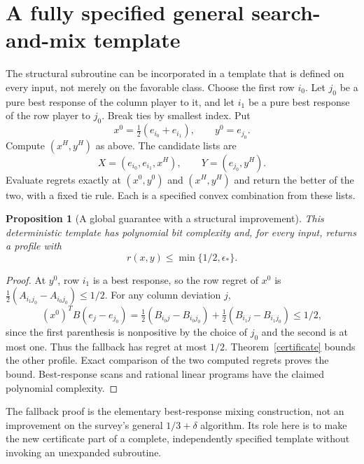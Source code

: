 \documentclass[11pt]{article}
\newtheorem{proposition}[theorem]{Proposition}
\theoremstyle{definition}
\begin{document}
\section{A fully specified general search-and-mix template}
The structural subroutine can be incorporated in a template that is
defined on every input, not merely on the favorable class. Choose the
first row $i_0$. Let $j_0$ be a pure best response of the column player
to it, and let $i_1$ be a pure best response of the row player to $j_0$.
Break ties by smallest index. Put
\[
 x^0=\tfrac12(e_{i_0}+e_{i_1}),\qquad y^0=e_{j_0}.
\]
Compute $(x^H,y^H)$ as above. The candidate lists are
\[
 X=(e_{i_0},e_{i_1},x^H),\qquad Y=(e_{j_0},y^H).
\]
Evaluate regrets exactly at $(x^0,y^0)$ and $(x^H,y^H)$ and return the
better of the two, with a fixed tie rule. Each is a specified convex
combination from these lists.
\begin{proposition}[A global guarantee with a structural improvement]\label{template}
This deterministic template has polynomial bit complexity and, for every
input, returns a profile with
\[
 r(x,y)\le\min\{1/2,\epsilon_*\}.
\]
\end{proposition}
\begin{proof}
At $y^0$, row $i_1$ is a best response, so the row regret of $x^0$ is
$\tfrac12(A_{i_1j_0}-A_{i_0j_0})\le1/2$. For any column deviation $j$,
\[
 (x^0)^TB(e_j-e_{j_0})
 =\tfrac12(B_{i_0j}-B_{i_0j_0})
  +\tfrac12(B_{i_1j}-B_{i_1j_0})\le1/2,
\]
since the first parenthesis is nonpositive by the choice of $j_0$ and
the second is at most one. Thus the fallback has regret at most $1/2$.
Theorem~\ref{certificate} bounds the other profile. Exact comparison of
the two computed regrets proves the bound. Best-response scans and
rational linear programs have the claimed polynomial complexity.
\end{proof}
The fallback proof is the elementary best-response mixing construction,
not an improvement on the survey's general $1/3+\delta$ algorithm.
Its role here is to make the new certificate part of a complete,
independently specified template without invoking an unexpanded subroutine.
\end{document}
